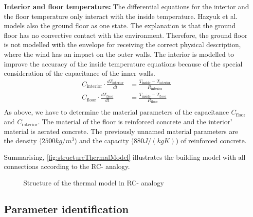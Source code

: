     \textbf{Interior and floor temperature:}\newline
    The differential equations for the interior and the floor temperature only interact with the inside temperature. 
    Hazyuk et al. \cite{Hazyuk.2012} models also the ground floor as one state. The explanation is that the ground floor has no convective contact with the environment. Therefore, the ground floor is not modelled with the envelope for receiving the correct physical description, where the wind has an impact on the outer walls.
    The interior is modelled to improve the accuracy of the inside temperature equations because of the special consideration of the capacitance of the inner walls.
    \begin{align}
    C_\text{interior}\cdot \frac{d T_\text{interior}}{d t} &= \frac{T_\text{inside}-T_\text{interior}}{R_\text{interior}} \\
       C_\text{floor} \cdot \frac{d T_\text{floor}}{d t} &= \frac{T_\text{inside}-T_\text{floor}}{R_\text{floor}} \nonumber\\
    \end{align}
    As above, we have to determine the material parameters of the capacitance $C_\text{floor}$ and $C_\text{interior}$. The material of the floor is reinforced concrete and the interior' material is aerated concrete. The previously unnamed material parameters are the density ($2500 kg/m^3$) \cite{AntonSchweizer.12.10.2021} and the capacity ($880 J/(kg K)$) \cite{AntonSchweizer.12.10.2021b} of reinforced concrete.\newline
     
    Summarising, \autoref{fig:structureThermalModel} illustrates the building model with all connections according to the RC- analogy.
    \begin{figure}[h]
            \centering
            \def\svgwidth{410pt}
            
            \caption{Structure of the thermal model in RC- analogy}
            \label{fig:structureThermalModel}
        \end{figure}
        
    \subsection{Parameter identification}
    \label{WorkflowModel}
    
